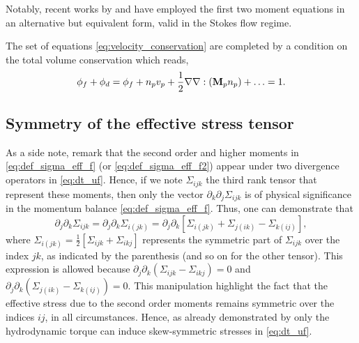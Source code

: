 Notably, recent works by \citet{dolata2021faxen} and \citet{zhou2020lamb} have employed the first two moment equations in an alternative but equivalent form, valid in the Stokes flow regime.

The set of equations \ref{eq:velocity_conservation} are completed by a condition on the total volume conservation which reads, 
\begin{equation}
    \phi_f + \phi_d = 
    \phi_f +  n_pv_p + \frac{1}{2}\grad\grad : (\textbf{M}_p n_p) + \ldots = 1. 
    \label{eq:volume_conservation}
\end{equation}


\subsection{Symmetry of the effective stress tensor}
As a side note, remark that the second order and higher moments in \ref{eq:def_sigma_eff_f} (or \ref{eq:def_sigma_eff_f2}) appear under two divergence operators in \ref{eq:dt_uf}. 
Hence, if we note $\Sigma_{ijk}$ the third rank tensor that represent these moments, then only the vector $\partial_k \partial_j\Sigma_{ijk}$ is of physical significance in the momentum balance \eqref{eq:def_sigma_eff_f}.
Thus, one can demonstrate that \citep{lhuillier1996contribution}
\begin{equation}
    \partial_j \partial_k \Sigma_{ijk}
    = \partial_j \partial_k \Sigma_{i(jk)}
    =
    \partial_j \partial_k \left[
        \Sigma_{i(jk)}
        + \Sigma_{j(ik)}
        - \Sigma_{k(ij)}
    \right],
    \label{eq:sym_proof}
\end{equation}
where $\Sigma_{i(jk)} = \frac{1}{2}[\Sigma_{ijk} + \Sigma_{ikj}]$ represents the symmetric part of $\Sigma_{ijk}$ over the index $jk$, as indicated by the parenthesis (and so on for the other tensor). 
This expression is allowed because $\partial_j \partial_k (\Sigma_{ijk} - \Sigma_{ikj}) = 0$ and $\partial_j \partial_k (\Sigma_{j(ik)} - \Sigma_{k(ij)}) = 0$. 
This manipulation highlight the fact that the effective stress due to the second order moments remains symmetric over the indices $ij$, in all circumstances.
Hence, as already demonstrated by \citet{lhuillier1996contribution} only the hydrodynamic torque can induce skew-symmetric stresses in \ref{eq:dt_uf}. 





